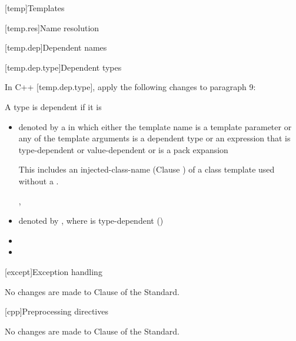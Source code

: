 
[temp]{Templates}

\setcounter{section}{6}
[temp.res]{Name resolution}

\setcounter{subsection}{1}
[temp.dep]{Dependent names}

[temp.dep.type]{Dependent types}

\pnum
In C++ [temp.dep.type], apply the following changes to paragraph 9:

\setcounter{Paras}{9}
\setcounter{Bullets1}{7}

\begin{std.txt}

A type is dependent if it is \newline
[...]

\begin{itemize}
  \item denoted by a  in which either the template name is a template parameter or any of
the template arguments is a dependent type or an expression that is type-dependent or value-dependent
or is a pack expansion \begin{note} This includes an injected-class-name (Clause
) of a class template used
without a . \end{note}, 

  \item denoted by \tcode{)}, where
         is type-dependent ()

  \item {}

  \item {}
\end{itemize}
\end{std.txt}

[except]{Exception handling}

No changes are made to Clause \the\value{chapter} of the \Cpp Standard.

[cpp]{Preprocessing directives}

No changes are made to Clause \the\value{chapter} of the \Cpp Standard.
